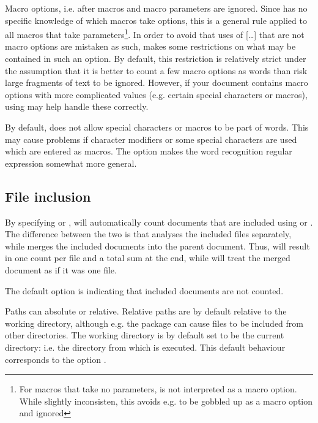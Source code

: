 \documentclass{article}
\begin{document}
Macro options, i.e. \code{[\ldots]} after macros and macro parameters are ignored. Since \TeXcount{} has no specific knowledge of which macros take options, this is a general rule applied to all macros that take parameters\footnote{For macros that take no parameters, \code{[\ldots]} is not interpreted as a macro option. While slightly inconsisten, this avoids e.g.  to be gobbled up as a macro option and ignored}. In order to avoid that uses of [\ldots] that are not macro options are mistaken as such, \TeXcount{} makes some restrictions on what may be contained in such an option. By default, this restriction is relatively strict under the assumption that it is better to count a few macro options as words than risk large fragments of text to be ignored. However, if your document contains macro options with more complicated values (e.g. certain special characters or macros), using  may help handle these correctly.

By default, \TeXcount{} does not allow special characters or macros to be part of words. This may cause problems if character modifiers or some special characters are used which are entered as macros. The  option makes the word recognition regular expression somewhat more general.


\subsection{File inclusion}

By specifying  or , \TeXcount{} will automatically count documents that are included using  or . The difference between the two is that  analyses the included files separately, while  merges the included documents into the parent document. Thus,  will result in one count per file and a total sum at the end, while  will treat the merged document as if it was one file.

The default option is  indicating that included documents are not counted.

Paths can absolute or relative. Relative paths are by default relative to the working directory, although e.g. the  package can cause files to be included from other directories. The working directory is by default set to be the current directory: i.e. the directory from which \TeXcount{} is executed. This default behaviour corresponds to the option .
\end{document}

